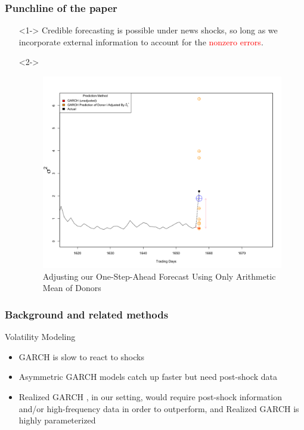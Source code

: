\documentclass[9pt]{beamer}
\theoremstyle{definition}
\begin{document}
\begin{frame}
\frametitle{Punchline of the paper}

\begin{itemize}
    \item[] <1-> Credible forecasting is possible under news shocks, so long as we incorporate external information to account for the \textcolor{red}{nonzero errors}.
    \item[] <2-> \begin{figure}[H]
        \begin{center}
          \includegraphics[scale=.3]{simulation_plots/motivating_piece_convex_combination.png}
          \caption{Adjusting our One-Step-Ahead Forecast Using Only Arithmetic Mean of Donors}
          \end{center}
        \end{figure}
\end{itemize}
\end{frame}

\begin{frame}
    \frametitle{Background and related methods}
    Volatility Modeling

    \begin{itemize}
        \item GARCH is slow to react to shocks \parencite[][]{andersen2003modeling}
        \item Asymmetric GARCH models catch up faster but need post-shock data
        \item Realized GARCH \parencite[][]{hansen2012realized}, in our setting, would require post-shock information and/or high-frequency data in order to outperform, and Realized GARCH is highly parameterized
    \end{itemize}
\end{frame}
\end{document}
